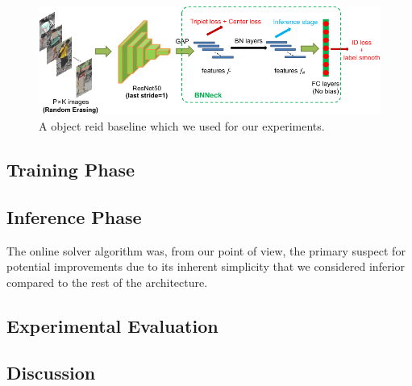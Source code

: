 \begin{figure}[t]
    \centering
    \includegraphics[width=\linewidth]{figures/methodology/bagoftricks_reid_architecture.pdf}
    \caption[Gls{reid} baseline]{A object \gls{reid} baseline which we used for our experiments. }
    \label{fig:BagOfTricksReIDArchitecture}
\end{figure}

\subsection{Training Phase}

\subsection{Inference Phase}

The online solver algorithm was, from our point of view, the primary suspect for potential improvements due to its inherent simplicity that we considered inferior compared to the rest of the architecture.

\subsection{Experimental Evaluation}

\subsection{Discussion}